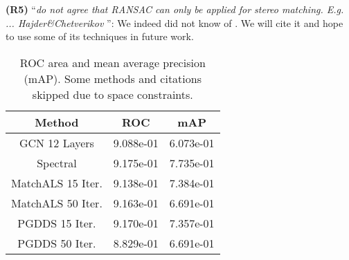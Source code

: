 \documentclass[10pt,twocolumn,letterpaper]{article}
\begin{document}
\textbf{(R5)} ``\textit{do not agree that RANSAC can only be applied for stereo matching. E.g. ... Hajder\&Chetverikov }'':
We indeed did not know of \cite{hajder2006weak}. We will cite it and hope to use some of its techniques in future work.

\begin{table}[t]
\begin{center}
\begin{tabular}{ |c|c|c| }
\hline
Method           & ROC       & mAP       \\ \hline
GCN 12 Layers                                     & 9.088e-01 & 6.073e-01 \\ \hline
Spectral          & 9.175e-01 & 7.735e-01 \\ \hline
MatchALS 15 Iter. & 9.138e-01 & 7.384e-01 \\ \hline
MatchALS 50 Iter. & 9.163e-01 & 6.691e-01 \\ \hline
PGDDS    15 Iter. & 9.170e-01 & 7.357e-01 \\ \hline
PGDDS    50 Iter. & 8.829e-01 & 6.691e-01 \\ \hline
\end{tabular}
\end{center}
\caption{ROC area and mean average precision (mAP). Some methods and citations skipped due to space constraints.}
\vspace{-15pt}
\end{table}

\end{document}
